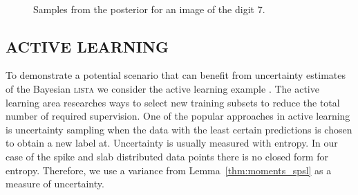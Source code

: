 \documentclass[letterpaper]{article}
\begin{document}
\begin{figure}[t]
\centering
{}~
~
\caption{Samples from the posterior for an image of the digit 7.}
\label{fig:posterior_samples}
\end{figure}

\subsection{\uppercase{Active learning}}
To demonstrate a potential scenario that can benefit from uncertainty estimates of the Bayesian \textsc{lista} we consider the active learning example \citep{settles.tr09}. The active learning area researches ways to select new training subsets to reduce the total number of required supervision. One of the popular approaches in active learning is uncertainty sampling when the data with the least certain predictions is chosen to obtain a new label at. Uncertainty is usually measured with entropy. In our case of the spike and slab distributed data points there is no closed form for entropy. Therefore, we use a variance from Lemma~\ref{thm:moments_spsl} as a measure of uncertainty.
\end{document}
